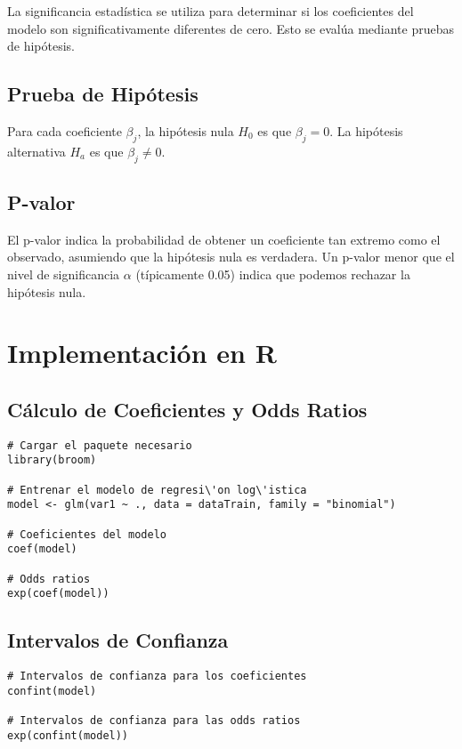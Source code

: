\documentclass[a4paper]{report} %
\begin{document}
La significancia estad\'istica se utiliza para determinar si los coeficientes del modelo son significativamente diferentes de cero. Esto se eval\'ua mediante pruebas de hip\'otesis.

\subsection{Prueba de Hip\'otesis}

Para cada coeficiente $\beta_j$, la hip\'otesis nula $H_0$ es que $\beta_j = 0$. La hip\'otesis alternativa $H_a$ es que $\beta_j \neq 0$.

\subsection{P-valor}

El p-valor indica la probabilidad de obtener un coeficiente tan extremo como el observado, asumiendo que la hip\'otesis nula es verdadera. Un p-valor menor que el nivel de significancia $\alpha$ (t\'ipicamente 0.05) indica que podemos rechazar la hip\'otesis nula.

\section{Implementaci\'on en R}

\subsection{C\'alculo de Coeficientes y Odds Ratios}

\begin{verbatim}
# Cargar el paquete necesario
library(broom)

# Entrenar el modelo de regresi\'on log\'istica
model <- glm(var1 ~ ., data = dataTrain, family = "binomial")

# Coeficientes del modelo
coef(model)

# Odds ratios
exp(coef(model))
\end{verbatim}

\subsection{Intervalos de Confianza}

\begin{verbatim}
# Intervalos de confianza para los coeficientes
confint(model)

# Intervalos de confianza para las odds ratios
exp(confint(model))
\end{verbatim}
\end{document}
